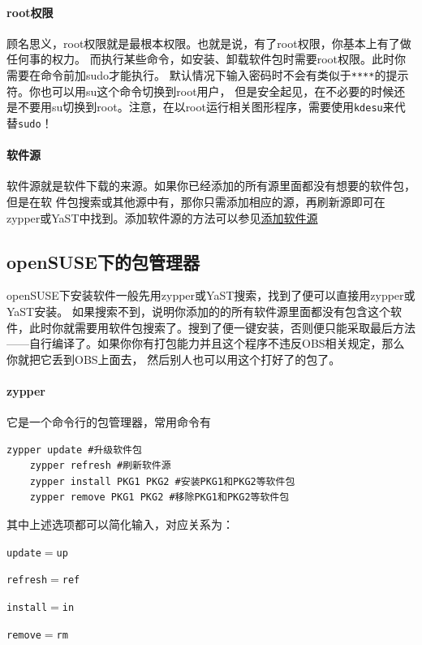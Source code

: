 \documentclass[11pt,openany]{book}
\newcommand{\command}[1]{\texttt{\textcolor{codec}{#1}}}
\newcommand{\zy}{zypper或YaST}
\newcommand{\simp}[2]{\command{#1}$=$\command{#2}}
\begin{document}
\paragraph{root权限} 顾名思义，root权限就是最根本权限。也就是说，有了root权限，你基本上有了做任何事的权力。
而执行某些命令，如安装、卸载软件包时需要root权限。此时你需要在命令前加sudo才能执行。
默认情况下输入密码时不会有类似于\command{****}的提示符。你也可以用su这个命令切换到root用户，
但是安全起见，在不必要的时候还是不要用su切换到root。注意，在以root运行相关图形程序，需要使用\command{kdesu}来代替\command{sudo}！

\paragraph{软件源} 软件源就是软件下载的来源。如果你已经添加的所有源里面都没有想要的软件包，但是在软
件包搜索或其他源中有，那你只需添加相应的源，再刷新源即可在\zy 中找到。添加软件源的方法可以参见\href{https://zh.opensuse.org/SDB:%E6%B7%BB%E5%8A%A0%E8%BD%AF%E4%BB%B6%E6%BA%90}{添加软件源}
\subsection[包管理器]{openSUSE下的包管理器}
openSUSE下安装软件一般先用\zy 搜索，找到了便可以直接用\zy 安装。
如果搜索不到，说明你添加的的所有软件源里面都没有包含这个软件，此时你就需要用软件包搜索了。搜到了便一键安装，否则便只能采取最后方法——自行编译了。如果你你有打包能力并且这个程序不违反OBS相关规定，那么你就把它丢到OBS上面去，
然后别人也可以用这个打好了的包了。
\paragraph{zypper}\label{pre} 它是一个命令行的包管理器，常用命令有
\begin{Verbatim}[formatcom=\color{codec}]
    zypper update #升级软件包
    zypper refresh #刷新软件源
    zypper install PKG1 PKG2 #安装PKG1和PKG2等软件包
    zypper remove PKG1 PKG2 #移除PKG1和PKG2等软件包
\end{Verbatim}
其中上述选项都可以简化输入，对应关系为：
\begin{compactitem}
 \item \simp{update}{up}
 \item \simp{refresh}{ref}
 \item \simp{install}{in}
 \item \simp{remove}{rm}
\end{compactitem}
\end{document}
